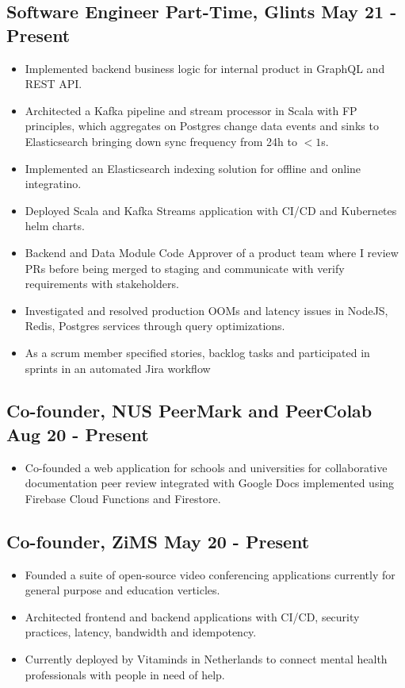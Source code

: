 \documentclass[9pts]{article}
\begin{document}
\subsection*{Software Engineer Part-Time, Glints \hfill May 21 - Present}
\begin{itemize}
    \item Implemented backend business logic for internal product in GraphQL and REST API.
    \item Architected a Kafka pipeline and stream processor in Scala with FP principles, which aggregates on Postgres change data events and sinks to Elasticsearch bringing down sync frequency from 24h to $<1$s.
    \item Implemented an Elasticsearch indexing solution for offline and online integratino.
    \item Deployed Scala and Kafka Streams application with CI/CD and Kubernetes helm charts.
    \item Backend and Data Module Code Approver of a product team where I review PRs before being merged to staging and communicate with verify requirements with stakeholders.
    \item Investigated and resolved production OOMs and latency issues in NodeJS, Redis, Postgres services through query optimizations.
    \item As a scrum member specified stories, backlog tasks and participated in sprints in an automated Jira workflow
\end{itemize}

\subsection*{Co-founder, NUS PeerMark and PeerColab \href{https://youtu.be/LVmKodrE8e0}{\faYoutube} \hfill Aug 20 - Present}
\begin{itemize}
    \item Co-founded a web application for schools and universities for collaborative documentation peer review integrated with Google Docs implemented using Firebase Cloud Functions and Firestore.
\end{itemize}

\subsection*{Co-founder, ZiMS \href{https://github.com/zims-live}{\faGithub} \hfill May 20 - Present}
\begin{itemize}
    \item Founded a suite of open-source video conferencing applications currently for general purpose and education verticles.
    \item Architected frontend and backend applications with CI/CD, security practices, latency, bandwidth and idempotency.
    \item Currently deployed by Vitaminds in Netherlands to connect mental health professionals with people in need of help.
\end{itemize}
\end{document}
